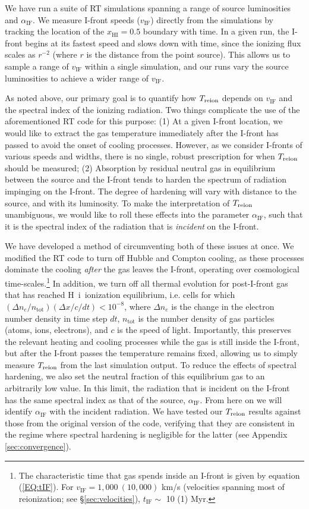\documentclass[twocolumn]{aastex62}
\newcommand{\HI}{H{\sc~i}}
\newcommand{\Treion}{T_{\rm reion}}
\newcommand{\vIF}{v_{\mathrm{IF}}}
\newcommand{\spec}{\alpha_{\mathrm{IF}}}
\begin{document}
We have run a suite of RT simulations spanning a range of source luminosities and $\spec$.  We measure I-front speeds ($\vIF$) directly from the simulations by tracking the location of the $x_{\mathrm{HI}} = 0.5$ boundary with time.  In a given run, the I-front begins at its fastest speed and slows down with time, since the ionizing flux scales as $r^{-2}$ (where $r$ is the distance from the point source). This allows us to sample a range of $\vIF$ within a single simulation, and our runs vary the source luminosities to achieve a wider range of $\vIF$.  

As noted above, our primary goal is to quantify how $\Treion$ depends on $\vIF$ and the spectral index of the ionizing radiation.  Two things complicate the use of the aforementioned RT code for this purpose: (1) At a given I-front location, we would like to extract the gas temperature immediately after the I-front has passed to avoid the onset of cooling processes.  However, as we consider I-fronts of various speeds and widths, there is no single, robust prescription for when $\Treion$ should be measured; (2) Absorption by residual neutral gas in equilibrium between the source and the I-front tends to harden the spectrum of  radiation impinging on the I-front.   The degree of hardening will vary with distance to the source, and with its luminosity. To make the interpretation of $\Treion$ unambiguous, we would like to roll these effects into the parameter $\spec$, such that it is the spectral index of the radiation that is {\it incident} on the I-front.  

We have developed a method of circumventing both of these issues at once.  We modified the RT code to turn off Hubble and Compton cooling, as these processes dominate the cooling {\it after} the gas leaves the I-front, operating over cosmological time-scales.\footnote{The characteristic time that gas spends inside an I-front is given by equation (\ref{EQ:tIF}). For $\vIF = 1,000~(10,000)$ km/s (velocities spanning most of reionization; see \S \ref{sec:velocities}), $t_{\mathrm{IF}}\sim$ 10 (1) Myr. }  In addition, we turn off all thermal evolution for post-I-front gas that has reached \HI\ ionization equilibrium, i.e. cells for which $(\Delta n_e/n_\mathrm{tot}) (\Delta x/c/dt)< 10^{-8}$, where $\Delta n_e$ is the change in the electron number density in time step $dt$, $n_\mathrm{tot}$ is the number density of gas particles (atoms, ions, electrons), and $c$ is the speed of light.  Importantly, this preserves the relevant heating and cooling processes while the gas is still inside the I-front, but after the I-front passes the temperature remains fixed, allowing us to simply measure $\Treion$ from the last simulation output.   To reduce the effects of spectral hardening, we also set the neutral fraction of this equilibrium gas to an arbitrarily low value.  In this limit, the radiation that is incident on the I-front has the same spectral index as that of the source, $\spec$. From here on we will identify $\spec$ with the incident radiation.  We have tested our $\Treion$ results against those from the original version of the code, verifying that they are consistent in the regime where spectral hardening is negligible for the latter (see Appendix \ref{sec:convergence}). 
\end{document}
